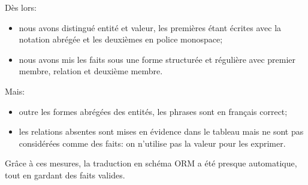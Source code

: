 \documentclass[a4paper,10pt]{article}
\begin{document}
Dès lors:
\begin{itemize}
    \item nous avons distingué entité et valeur, les premières étant écrites avec la notation abrégée et les deuxièmes en police monospace;
    \item nous avons mis les faits sous une forme structurée et régulière avec premier membre, relation et deuxième membre.
\end{itemize}

Mais:
\begin{itemize}
    \item outre les formes abrégées des entités, les phrases sont en français correct;
    \item les relations absentes sont mises en évidence dans le tableau mais ne sont pas considérées comme des faits: on n'utilise pas la valeur  pour les exprimer.
\end{itemize}

Grâce à ces mesures, la traduction en schéma ORM a été presque automatique, tout en gardant des faits valides.
\end{document}
